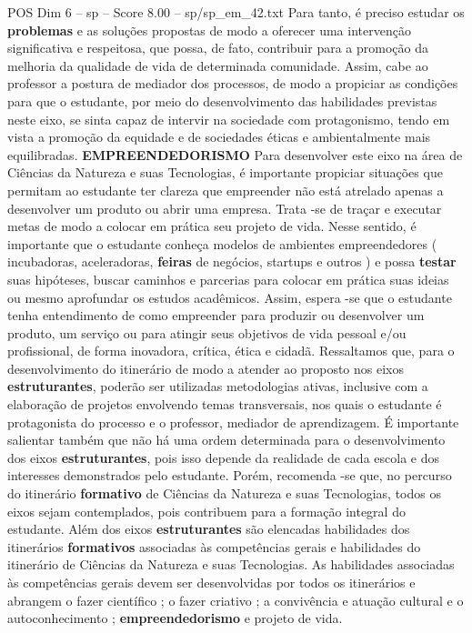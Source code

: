 \begin{textsample}{POS Dim 6 – sp – Score 8.00 – sp/sp\_em\_42.txt}
Para tanto, é preciso estudar os \textbf{problemas} e as soluções propostas de modo a oferecer uma intervenção significativa e respeitosa, que possa, de fato, contribuir para a promoção da melhoria da qualidade de vida de determinada comunidade.
Assim, cabe ao professor a postura de mediador dos processos, de modo a propiciar as condições para que o estudante, por meio do desenvolvimento das habilidades previstas neste eixo, se sinta capaz de intervir na sociedade com protagonismo, tendo em vista a promoção da equidade e de sociedades éticas e ambientalmente mais equilibradas. \textbf{EMPREENDEDORISMO} Para desenvolver este eixo na área de Ciências da Natureza e suas Tecnologias, é importante propiciar situações que permitam ao estudante ter clareza que empreender não está atrelado apenas a desenvolver um produto ou abrir uma empresa.
Trata -se de traçar e executar metas de modo a colocar em prática seu projeto de vida.
Nesse sentido, é importante que o estudante conheça modelos de ambientes empreendedores ( incubadoras, aceleradoras, \textbf{feiras} de negócios, startups e outros ) e possa \textbf{testar} suas hipóteses, buscar caminhos e parcerias para colocar em prática suas ideias ou mesmo aprofundar os estudos acadêmicos.
Assim, espera -se que o estudante tenha entendimento de como empreender para produzir ou desenvolver um produto, um serviço ou para atingir seus objetivos de vida pessoal e/ou profissional, de forma inovadora, crítica, ética e cidadã.
Ressaltamos que, para o desenvolvimento do itinerário de modo a atender ao proposto nos eixos \textbf{estruturantes}, poderão ser utilizadas metodologias ativas, inclusive com a elaboração de projetos envolvendo temas transversais, nos quais o estudante é protagonista do processo e o professor, mediador de aprendizagem.
É importante salientar também que não há uma ordem determinada para o desenvolvimento dos eixos \textbf{estruturantes}, pois isso depende da realidade de cada escola e dos interesses demonstrados pelo estudante.
Porém, recomenda -se que, no percurso do itinerário \textbf{formativo} de Ciências da Natureza e suas Tecnologias, todos os eixos sejam contemplados, pois contribuem para a formação integral do estudante.
Além dos eixos \textbf{estruturantes} são elencadas habilidades dos itinerários \textbf{formativos} associadas às competências gerais e habilidades do itinerário de Ciências da Natureza e suas Tecnologias.
As habilidades associadas às competências gerais devem ser desenvolvidas por todos os itinerários e abrangem o fazer científico ; o fazer criativo ; a convivência e atuação cultural e o autoconhecimento ; \textbf{empreendedorismo} e projeto de vida.

\end{textsample}

